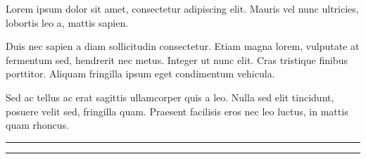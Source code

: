 
Lorem ipsum dolor sit amet, consectetur adipiscing elit.
Mauris vel nunc ultricies, lobortis leo a, mattis sapien.

Duis nec sapien a diam sollicitudin consectetur.
Etiam magna lorem, vulputate at fermentum sed, hendrerit nec metus.
Integer ut nunc elit.
Cras tristique finibus porttitor.
Aliquam fringilla ipsum eget condimentum vehicula.

Sed ac tellus ac erat sagittis ullamcorper quis a leo.
Nulla sed elit tincidunt, posuere velit sed, fringilla quam.
Praesent facilisis eros nec leo luctus, in mattis quam rhoncus.

\vspace{3cm}

\rule{7cm}{0.4pt} \hfill \rule{7cm}{0.4pt} \\
\vspace{1cm}
\maitreApprentissage \hfill \nomAuteur \\
